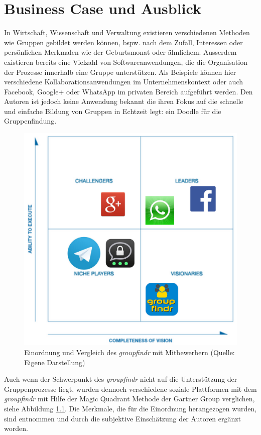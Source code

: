 \chapter{Business Case und Ausblick}
\label{business_case}

In Wirtschaft, Wissenschaft und Verwaltung existieren verschiedenen Methoden wie Gruppen gebildet werden können, bspw. nach dem Zufall, Interessen oder persönlichen Merkmalen wie der Geburtsmonat oder ähnlichem. Ausserdem existieren bereits eine Vielzahl von Softwareanwendungen, die die Organisation der Prozesse innerhalb eine Gruppe unterstützen. Als Beispiele können hier verschiedene Kollaborationsanwendungen im Unternehmenskontext oder auch Facebook, Google+ oder WhatsApp im privaten Bereich aufgeführt werden. Den Autoren ist jedoch keine Anwendung bekannt die ihren Fokus auf die schnelle und einfache Bildung von Gruppen in Echtzeit legt: ein Doodle für die Gruppenfindung. 

\begin{figure}[h]
\centering
\includegraphics[width=0.7\linewidth]{graphiken/magic_quadrant.png}%
\caption{Einordnung und Vergleich des \emph{groupfindr} mit Mitbewerbern (Quelle: Eigene Darstellung)}%
\label{magic_quadrant}%
\end{figure}

Auch wenn der Schwerpunkt des \emph{groupfindr} nicht auf die Unterstützung der Gruppenprozesse liegt, wurden dennoch verschiedene soziale Plattformen mit dem \emph{groupfindr} mit Hilfe der Magic Quadrant Methode der Gartner Group \citet{magic_quadrant} verglichen, siehe Abbildung \ref{magic_quadrant}.  Die Merkmale, die für die Einordnung herangezogen wurden, sind \citet{gruppen-bildung} entnommen und durch die subjektive Einschätzung der Autoren ergänzt worden.


